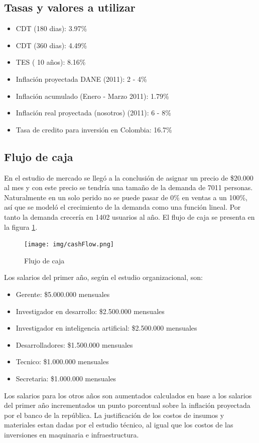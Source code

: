 \documentclass[a4paper, 12pt, oneside]{article}
\begin{document}
	\subsection{Tasas y valores a utilizar}
	\begin{itemize}
		\item CDT (180 dias): 3.97\%
		\item CDT (360 dias): 4.49\%
		\item TES ( 10 años): 8.16\%
		\item Inflación proyectada DANE (2011): 2 - 4\%
		\item Inflación acumulado (Enero - Marzo 2011): 1.79\%
		\item Inflación real proyectada (nosotros) (2011): 6 - 8\%
		\item Tasa de credito para inversión en Colombia: 16.7\%
	\end{itemize}
	
	\subsection{Flujo de caja}
	En el estudio de mercado se llegó a la conclusión de asignar un precio de \$20.000 al mes y con este precio se tendría una tamaño de la demanda de 7011 personas. Naturalmente en un solo perido no se puede pasar de 0\% en ventas a un 100\%, así que se modeló el crecimiento de la demanda como una función lineal. Por tanto la demanda crecería en 1402 usuarios al año. El flujo de caja se presenta en la figura \ref{fig:cashFlow}.
	
	\begin{figure}
	\begin{center}
	\leavevmode
	\texttt{[image: img/cashFlow.png]}
	\end{center}
	\caption{Flujo de caja}
	\label{fig:cashFlow}
	\end{figure}
	
	Los salarios del primer año, según el estudio organizacional, son:
	\begin{itemize}
	\item Gerente: \$5.000.000 mensuales
	\item Investigador en desarrollo: \$2.500.000 mensuales
	\item Investigador en inteligencia artificial: \$2.500.000 mensuales
	\item Desarrolladores: \$1.500.000 mensuales
	\item Tecnico: \$1.000.000 mensuales
	\item Secretaria: \$1.000.000 mensuales
	\end{itemize}
	Los salarios para los otros años son aumentados calculados en base a los salarios del primer año incrementados un punto porcentual sobre la inflación proyectada por el banco de la república. La justificación de los costos de insumos y materiales estan dadas por el estudio técnico, al igual que los costos de las inversiones en maquinaria e infraestructura.
	
\end{document}
